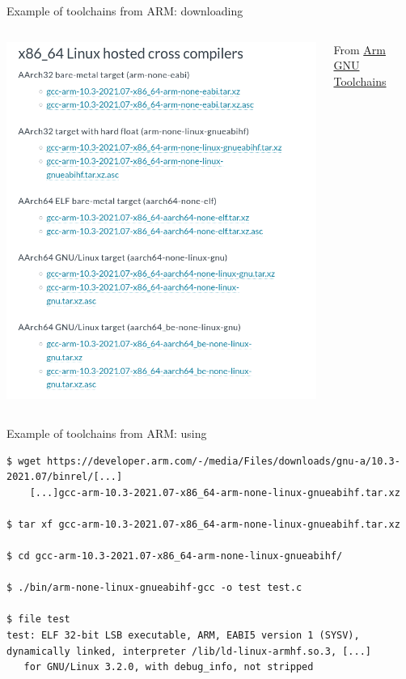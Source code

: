 \begin{frame}{Example of toolchains from ARM: downloading}
  \begin{columns}
    \begin{center}
      \includegraphics[height=0.8\textheight]{slides/sysdev-toolchains-obtaining/arm-toolchain.png}
    \end{center}
    From \href{https://developer.arm.com/tools-and-software/open-source-software/developer-tools/gnu-toolchain/downloads}
    {Arm GNU Toolchains}
  \end{columns}
\end{frame}

\begin{frame}[fragile]{Example of toolchains from ARM: using}
  \begin{block}{}
    {\tiny
\begin{verbatim}
$ wget https://developer.arm.com/-/media/Files/downloads/gnu-a/10.3-2021.07/binrel/[...]
    [...]gcc-arm-10.3-2021.07-x86_64-arm-none-linux-gnueabihf.tar.xz

$ tar xf gcc-arm-10.3-2021.07-x86_64-arm-none-linux-gnueabihf.tar.xz

$ cd gcc-arm-10.3-2021.07-x86_64-arm-none-linux-gnueabihf/

$ ./bin/arm-none-linux-gnueabihf-gcc -o test test.c

$ file test
test: ELF 32-bit LSB executable, ARM, EABI5 version 1 (SYSV), dynamically linked, interpreter /lib/ld-linux-armhf.so.3, [...]
   for GNU/Linux 3.2.0, with debug_info, not stripped
\end{verbatim}
    }
  \end{block}
\end{frame}

